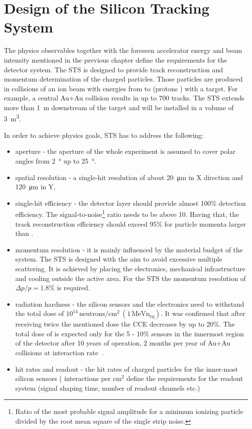 \section{Design of the Silicon Tracking System}
\label{STS}

The physics observables together with the foreseen accelerator energy and beam intensity mentioned in the previous chapter define the requirements for the detector system. The \gls{STS} is designed to provide track reconstruction and momentum determination of the charged particles. Those particles are produced in collisions of an ion beam with energies from  to  (protons ) with a target. For example, a central Au+Au collision results in up to 700 tracks. The \gls{STS} extends more than \SI{1}{\metre} downstream of the target and will be installed in a volume of \SI{3}{\cubic\metre}. 

In order to achieve physics goals, \gls{STS} has to address the following:
\begin{itemize}
    \item  aperture - the aperture of the whole experiment is assumed to cover polar angles from \SI{2}{\degree} up to \SI{25}{\degree}.
    \item spatial resolution - a single-hit resolution of about \SI{20}{\micro\metre} in X direction and \SI{120}{\micro\metre} in Y, 
    \item single-hit efficiency - the detector layer should provide almost 100\% detection efficiency. The signal-to-noise\footnote{Ratio of the most probable signal amplitude for a minimum ionizing particle divided by the root mean square of the single strip noise.} ratio needs to be above 10. Having that, the track reconstruction efficiency should exceed 95\% for particle momenta larger than . 
    \item momentum resolution - it is mainly influenced by the material budget of the system. The \gls{STS} is designed with the aim to avoid excessive multiple scattering. It is achieved by placing the electronics, mechanical infrastructure and cooling outside the active area. For the \gls{STS} the momentum resolution of $\Delta p/p = 1.8\%$ is required. 
    \item radiation hardness - the silicon sensors and the electronics need to withstand the total dose of $10^{14}\,\mathrm{neutrons/cm^{2}~(1\,MeV n_{eq})}$. It was confirmed that after receiving twice the mentioned dose the CCE decreases by up to 20\%. The total dose of  is expected only for the 5 - 10\% sensors in the innermost region of the detector after 10 years of operation, 2 months per year of  Au+Au collisions at  interaction rate~\cite{Heuser:54798}.
    \item hit rates and readout - the hit rates of charged particles for the inner-most silicon sensors ( interactions per $\mathrm{cm^{2}}$ define the requirements for the readout system (signal shaping time, number of readout channels etc.)
\end{itemize}


